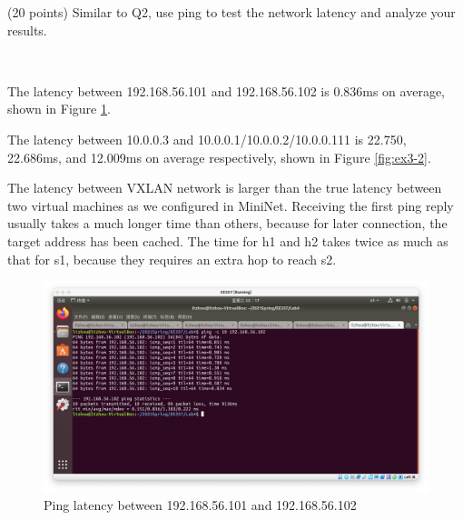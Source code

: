 \newpage

\begin{exercise}[]{(20 points) Similar to Q2, use ping to test the network latency and analyze your results.}
  \begin{solution}
  \par{~}

  The latency between 192.168.56.101 and 192.168.56.102 is 0.836ms on average, shown in Figure \ref{fig:ex3-1}.

  The latency between 10.0.0.3 and 10.0.0.1/10.0.0.2/10.0.0.111 is 22.750, 22.686ms, and 12.009ms on average respectively, shown in Figure \ref{fig:ex3-2}. 
  
  The latency between VXLAN network is larger than the true latency between two virtual machines as we configured in MiniNet. Receiving the first ping reply usually takes a much longer time than others, because for later connection, the target address has been cached. The time for h1 and h2 takes twice as much as that for s1, because they requires an extra hop to reach s2.

    \begin{figure}[ht]
    \begin{center}
    \includegraphics[width=12cm]{img/lab4/ex3-1}
    \caption{Ping latency between 192.168.56.101 and 192.168.56.102}
    \label{fig:ex3-1}
    \end{center}
    \end{figure}



\end{solution}
\end{exercise}
